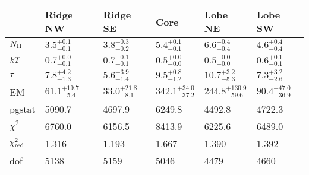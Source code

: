 \begin{tabular}{@{}llllll@{}}
\toprule
 & Ridge NW & Ridge SE & Core & Lobe NE & Lobe SW \\
\midrule
$N_{\mathrm{H}}$ & ${3.5}^{+0.1}_{-0.1}$ & ${3.8}^{+0.3}_{-0.2}$ & ${5.4}^{+0.1}_{-0.1}$ & ${6.6}^{+0.4}_{-0.4}$ & ${4.6}^{+0.4}_{-0.4}$ \\
$k T$ & ${0.7}^{+0.0}_{-0.1}$ & ${0.7}^{+0.1}_{-0.1}$ & ${0.5}^{+0.0}_{-0.0}$ & ${0.5}^{+0.0}_{-0.0}$ & ${0.6}^{+0.1}_{-0.1}$ \\
$\tau$ & ${7.8}^{+4.2}_{-1.3}$ & ${5.6}^{+3.9}_{-1.4}$ & ${9.5}^{+0.8}_{-1.2}$ & ${10.7}^{+3.2}_{-5.3}$ & ${7.3}^{+3.2}_{-2.6}$ \\
EM & ${61.1}^{+19.7}_{-5.4}$ & ${33.0}^{+21.8}_{-8.1}$ & ${342.1}^{+34.0}_{-37.2}$ & ${244.8}^{+130.9}_{-59.6}$ & ${90.4}^{+47.0}_{-36.9}$ \\
\midrule
pgstat & 5090.7 & 4697.9 & 6249.8 & 4492.8 & 4722.3 \\
$\chi^2$ & 6760.0 & 6156.5 & 8413.9 & 6225.6 & 6489.0 \\
$\chi^2_{\mathrm{red}}$ & 1.316 & 1.193 & 1.667 & 1.390 & 1.392 \\
dof & 5138 & 5159 & 5046 & 4479 & 4660 \\
\bottomrule
\end{tabular}
